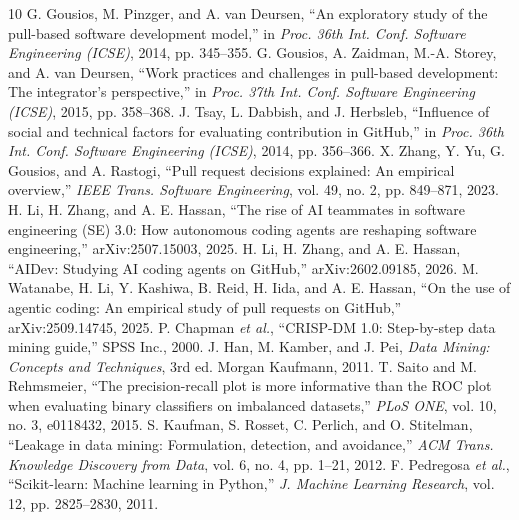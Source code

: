 \documentclass[conference]{IEEEtran}
\begin{document}
\balance
\begin{thebibliography}{10}
 G. Gousios, M. Pinzger, and A. van Deursen, ``An exploratory study of the pull-based software development model,'' in \textit{Proc. 36th Int. Conf. Software Engineering (ICSE)}, 2014, pp. 345--355.
 G. Gousios, A. Zaidman, M.-A. Storey, and A. van Deursen, ``Work practices and challenges in pull-based development: The integrator's perspective,'' in \textit{Proc. 37th Int. Conf. Software Engineering (ICSE)}, 2015, pp. 358--368.
 J. Tsay, L. Dabbish, and J. Herbsleb, ``Influence of social and technical factors for evaluating contribution in GitHub,'' in \textit{Proc. 36th Int. Conf. Software Engineering (ICSE)}, 2014, pp. 356--366.
 X. Zhang, Y. Yu, G. Gousios, and A. Rastogi, ``Pull request decisions explained: An empirical overview,'' \textit{IEEE Trans. Software Engineering}, vol. 49, no. 2, pp. 849--871, 2023.
 H. Li, H. Zhang, and A. E. Hassan, ``The rise of AI teammates in software engineering (SE) 3.0: How autonomous coding agents are reshaping software engineering,'' arXiv:2507.15003, 2025.
 H. Li, H. Zhang, and A. E. Hassan, ``AIDev: Studying AI coding agents on GitHub,'' arXiv:2602.09185, 2026.
 M. Watanabe, H. Li, Y. Kashiwa, B. Reid, H. Iida, and A. E. Hassan, ``On the use of agentic coding: An empirical study of pull requests on GitHub,'' arXiv:2509.14745, 2025.
 P. Chapman \textit{et al.}, ``CRISP-DM 1.0: Step-by-step data mining guide,'' SPSS Inc., 2000.
 J. Han, M. Kamber, and J. Pei, \textit{Data Mining: Concepts and Techniques}, 3rd ed. Morgan Kaufmann, 2011.
 T. Saito and M. Rehmsmeier, ``The precision-recall plot is more informative than the ROC plot when evaluating binary classifiers on imbalanced datasets,'' \textit{PLoS ONE}, vol. 10, no. 3, e0118432, 2015.
 S. Kaufman, S. Rosset, C. Perlich, and O. Stitelman, ``Leakage in data mining: Formulation, detection, and avoidance,'' \textit{ACM Trans. Knowledge Discovery from Data}, vol. 6, no. 4, pp. 1--21, 2012.
 F. Pedregosa \textit{et al.}, ``Scikit-learn: Machine learning in Python,'' \textit{J. Machine Learning Research}, vol. 12, pp. 2825--2830, 2011.
\end{thebibliography}
\end{document}
